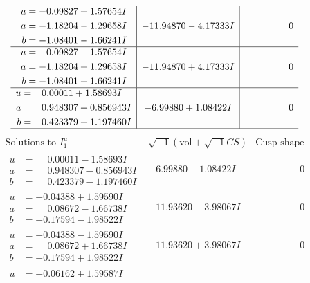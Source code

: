 \documentclass[1p]{elsarticle_modified}
\theoremstyle{definition}
\newcommand{\I}{\sqrt{-1}}
\begin{document}
$$\begin{array}{c|c|c}
\begin{aligned}
u &= -0.09827 + 1.57654 I \\
a &= -1.18204 - 1.29658 I \\
b &= -1.08401 - 1.66241 I\end{aligned}
 & -11.94870 - 4.17333 I & \phantom{-0.000000 } 0 \\ \hline\begin{aligned}
u &= -0.09827 - 1.57654 I \\
a &= -1.18204 + 1.29658 I \\
b &= -1.08401 + 1.66241 I\end{aligned}
 & -11.94870 + 4.17333 I & \phantom{-0.000000 } 0 \\ \hline\begin{aligned}
u &= \phantom{-}0.00011 + 1.58693 I \\
a &= \phantom{-}0.948307 + 0.856943 I \\
b &= \phantom{-}0.423379 + 1.197460 I\end{aligned}
 & -6.99880 + 1.08422 I & \phantom{-0.000000 } 0\\
 \hline 
 \end{array}$$\newpage$$\begin{array}{c|c|c}  
\text{Solutions to }I^u_{1}& \I (\text{vol} + \sqrt{-1}CS) & \text{Cusp shape}\\
 \hline 
\begin{aligned}
u &= \phantom{-}0.00011 - 1.58693 I \\
a &= \phantom{-}0.948307 - 0.856943 I \\
b &= \phantom{-}0.423379 - 1.197460 I\end{aligned}
 & -6.99880 - 1.08422 I & \phantom{-0.000000 } 0 \\ \hline\begin{aligned}
u &= -0.04388 + 1.59590 I \\
a &= \phantom{-}0.08672 - 1.66738 I \\
b &= -0.17594 - 1.98522 I\end{aligned}
 & -11.93620 - 3.98067 I & \phantom{-0.000000 } 0 \\ \hline\begin{aligned}
u &= -0.04388 - 1.59590 I \\
a &= \phantom{-}0.08672 + 1.66738 I \\
b &= -0.17594 + 1.98522 I\end{aligned}
 & -11.93620 + 3.98067 I & \phantom{-0.000000 } 0 \\ \hline\begin{aligned}
u &= -0.06162 + 1.59587 I \\

\end{aligned}
\end{array}$$
\end{document}
